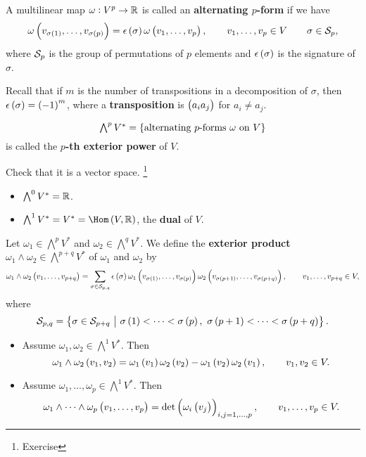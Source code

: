\begin{definition}
A multilinear map $ \omega : V^p \to \mathbb{R} $ is called an \textbf{alternating $ p $-form} if we have
$$ \omega\br{v_{\sigma\br{1}}, \dots, v_{\sigma\br{p}}} = \epsilon\br{\sigma}\omega\br{v_1, \dots, v_p}, \qquad v_1, \dots, v_p \in V \qquad \sigma \in \SSS_p, $$
where $ \mathcal{S}_p $ is the group of permutations of $ p $ elements and $ \epsilon\br{\sigma} $ is the signature of $ \sigma $.
\end{definition}

Recall that if $ m $ is the number of transpositions in a decomposition of $ \sigma $, then $ \epsilon\br{\sigma} = \br{-1}^m $, where a \textbf{transposition} is $ \br{a_ia_j} $ for $ a_i \ne a_j $.

\begin{notation}
$$ \textstyle\bigwedge^pV^* = \cbr{\text{alternating $ p $-forms} \ \omega \ \text{on} \ V} $$
is called the \textbf{$ p $-th exterior power} of $ V $.
\end{notation}

Check that it is a vector space. \footnote{Exercise}

\begin{example}
\hfill
\begin{itemize}
\item $ \bigwedge^0V^* = \mathbb{R} $.
\item $ \bigwedge^1V^* = V^* = \Hom\br{V, \RR} $, the \textbf{dual} of $ V $.
\end{itemize}
\end{example}

\begin{definition}
Let $ \omega_1 \in \bigwedge^pV^* $ and $ \omega_2 \in \bigwedge^qV^* $. We define the \textbf{exterior product} $ \omega_1 \wedge \omega_2 \in \bigwedge^{p + q}V^* $ of $ \omega_1 $ and $ \omega_2 $ by
$$ \omega_1 \wedge \omega_2\br{v_1, \dots, v_{p + q}} = \sum_{\sigma \in \SSS_{p, q}} \epsilon\br{\sigma}\omega_1\br{v_{\sigma\br{1}}, \dots, v_{\sigma\br{p}}}\omega_2\br{v_{\sigma\br{p + 1}}, \dots, v_{\sigma\br{p + q}}}, \qquad v_1, \dots, v_{p + q} \in V, $$
where
$$ \SSS_{p, q} = \cbr{\sigma \in \SSS_{p + q} \st \sigma\br{1} < \dots < \sigma\br{p}, \ \sigma\br{p + 1} < \dots < \sigma\br{p + q}}. $$
\end{definition}

\begin{example}
\hfill
\begin{itemize}
\item Assume $ \omega_1, \omega_2 \in \bigwedge^1V^* $. Then
$$ \omega_1 \wedge \omega_2\br{v_1, v_2} = \omega_1\br{v_1}\omega_2\br{v_2} - \omega_1\br{v_2}\omega_2\br{v_1}, \qquad v_1, v_2 \in V. $$
\item Assume $ \omega_1, \dots, \omega_p \in \bigwedge^1V^* $. Then
$$ \omega_1 \wedge \dots \wedge \omega_p\br{v_1, \dots, v_p} = \det \br{\omega_i\br{v_j}}_{i, j = 1, \dots, p}, \qquad v_1, \dots, v_p \in V. $$
\end{itemize}
\end{example}

